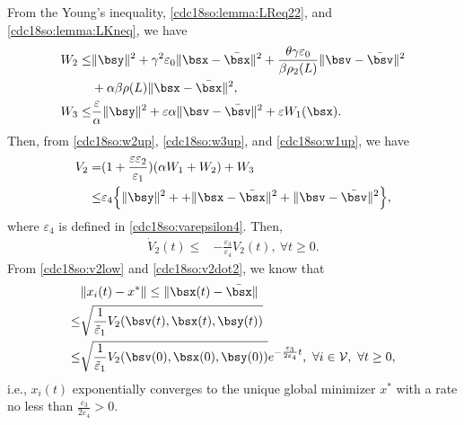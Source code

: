 \documentclass[letterpaper, 10 pt, conference]{ieeeconf}  %
\begin{document}
From  the Young's inequality, \eqref{cdc18so:lemma:LReq22}, and  \eqref{cdc18so:lemma:LKneq},  we have
\begin{align}
W_2\le& \|\bsy\|^2+\gamma^2\varepsilon_0\|\bsx-\bar{\bsx}\|^2
+\frac{\theta\gamma\varepsilon_0}{\beta\rho_2(L)}\|\bsv-\bar{\bsv}\|^2\nonumber\\
&+\alpha\beta\rho(L)\|\bsx-\bar{\bsx}\|^2,\label{cdc18so:w2up}\\
W_3\le& \frac{\varepsilon}{\alpha}\|\bsy\|^2+\varepsilon\alpha\|\bsv-\bar{\bsv}\|^2+\varepsilon W_1(\bsx).\label{cdc18so:w3up}
\end{align}
Then, from \eqref{cdc18so:w2up}, \eqref{cdc18so:w3up},  and \eqref{cdc18so:w1up}, we have
\begin{align}\label{cdc18so:v2up}
V_2=&(1+\frac{\varepsilon\varepsilon_2}{\varepsilon_1})(\alpha W_1+W_2)+W_3\nonumber\\
\le&\varepsilon_4\Big\{\|\bsy\|^2++\|\bsx-\bar{\bsx}\|^2+\|\bsv-\bar{\bsv}\|^2\Big\},
\end{align}
where $\varepsilon_4$ is defined in \eqref{cdc18so:varepsilon4}.
Then,
\begin{align}\label{cdc18so:v2dot2}
\dot{V}_2(t)\le& -\frac{\varepsilon_3}{\varepsilon_4}V_2(t),~\forall t\ge0.
\end{align}
From \eqref{cdc18so:v2low} and \eqref{cdc18so:v2dot2},
we know that
\begin{align*}
&\|x_i(t)-x^*\|\le\|\bsx(t)-\bar{\bsx}\| \\
\le& \sqrt{\frac{1}{\tilde{\varepsilon}_1}V_2(\bsv(t),\bsx(t),\bsy(t))}\\
\le&\sqrt{\frac{1}{\tilde{\varepsilon}_1}V_2(\bsv(0),\bsx(0),\bsy(0))}
e^{-\frac{\varepsilon_3}{2\varepsilon_4}t},~\forall i\in\mathcal V,~\forall t\ge0,
\end{align*}
i.e., $x_i(t)$ exponentially converges to the unique global minimizer $x^*$ with a rate no less than $\frac{\varepsilon_3}{2\varepsilon_4}>0$.
\end{document}
